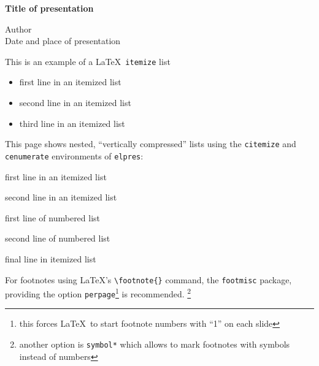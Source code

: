 \documentclass[11pt,pdftex,4x3]{elpres}
\begin{document}
\begin{titlepage}
  \centering
  {
    \Huge \bfseries \textcolor{eptitlecolor}{Title of presentation} \par
  }
  \vspace{1.3ex} \Large
  Author\\[2ex]
  {\normalsize \textcolor{ephighlightcolor}{Date and place of presentation}}
\end{titlepage}

\begin{psli}
This is an example of a \LaTeX\ \texttt{itemize} list 

\begin{itemize}
   \item first line in an itemized list
   \item second line in an itemized list
   \item third line in an itemized list
\end{itemize}
\end{psli}

\begin{psli}

This page shows nested, ``vertically compressed'' lists using the
\texttt{citemize} and \texttt{cenumerate} environments of 
      \texttt{elpres}:

\begin{citemize}
   \item first line in an itemized list
   \item second line in an itemized list
   \begin{cenumerate}
      \item first line of numbered list
      \item second line of numbered list
   \end{cenumerate}
   \item final line in itemized list
\end{citemize}

{\small For footnotes using \LaTeX's \verb+\footnote{}+ command, 
  the \texttt{footmisc} package, providing the
  option \texttt{perpage}\footnote{this forces \LaTeX\ to start
  footnote numbers with ``1'' on each slide}
   is recommended.%
  \footnote{another option is \texttt{symbol*} which allows
  to mark footnotes  with symbols instead of numbers} \par }
\end{psli}
\end{document}
